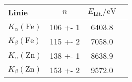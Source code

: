 \begin{tabular}{lSSS}
\toprule

{Linie} & {$n$} & {$E_\mathrm{Lit.} / \si{\electronvolt}$}\\

\midrule

$K_\alpha(\mathrm{Fe})$ & 106 +- 1 & 6403.8 \\
$K_\beta(\mathrm{Fe})$ & 115 +- 2 & 7058.0 \\
$K_\alpha(\mathrm{Zn})$ & 138 +- 1 & 8638.9 \\
$K_\beta(\mathrm{Zn})$ & 153 +- 2 & 9572.0 \\

\bottomrule
\end{tabular}